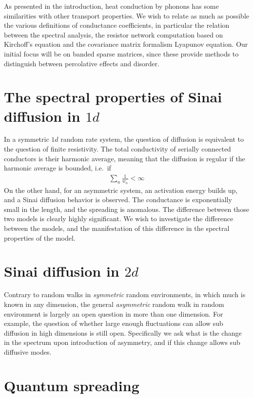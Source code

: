 As presented in the introduction, heat conduction by phonons has some
similarities with other transport properties. We wish to relate as much
as possible the various definitions of conductance coefficients, in 
particular the relation between the spectral analysis,
the resistor network computation based on Kirchoff's equation
and the covariance matrix formalism Lyapunov equation. Our initial focus
will be on banded sparse matrices, since these provide methods to distinguish
between percolative effects and disorder.


\section{The spectral properties of Sinai diffusion in $1d$}

In a symmetric $1d$ random rate system, the question of
diffusion is equivalent to the question of finite resistivity.
The total conductivity of serially connected conductors is their 
harmonic average, meaning that the diffusion is regular
if the harmonic average is bounded, i.e.\ if
%
\begin{align}
 \sum_n \frac{1}{w_n} < \infty 
\end{align}
%
On the other hand, for an asymmetric system, an activation energy 
builds up, and a Sinai diffusion behavior is observed.
The conductance is exponentially small in the length, and the spreading 
is anomalous. The difference between those two models is clearly highly 
significant. We wish to investigate the difference between the models,
and the manifestation of this difference in the spectral properties of the model.

\section{Sinai diffusion in $2d$}

Contrary to random walks in \emph{symmetric} random environments,
in which much is known in any dimension,
the general \emph{asymmetric} random walk in random environment is
largely an open question in more than one dimension. For example, 
the question of whether large enough fluctuations can allow
sub diffusion in high dimensions is still open.
Specifically we ask what is the change
in the spectrum upon introduction of asymmetry, and 
if this change allows sub diffusive modes.




\section{Quantum spreading}


